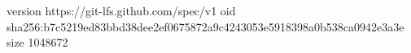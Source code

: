 version https://git-lfs.github.com/spec/v1
oid sha256:b7c5219ed83bbd38dee2ef0675872a9c4243053e5918398a0b538ca0942e3a3e
size 1048672

